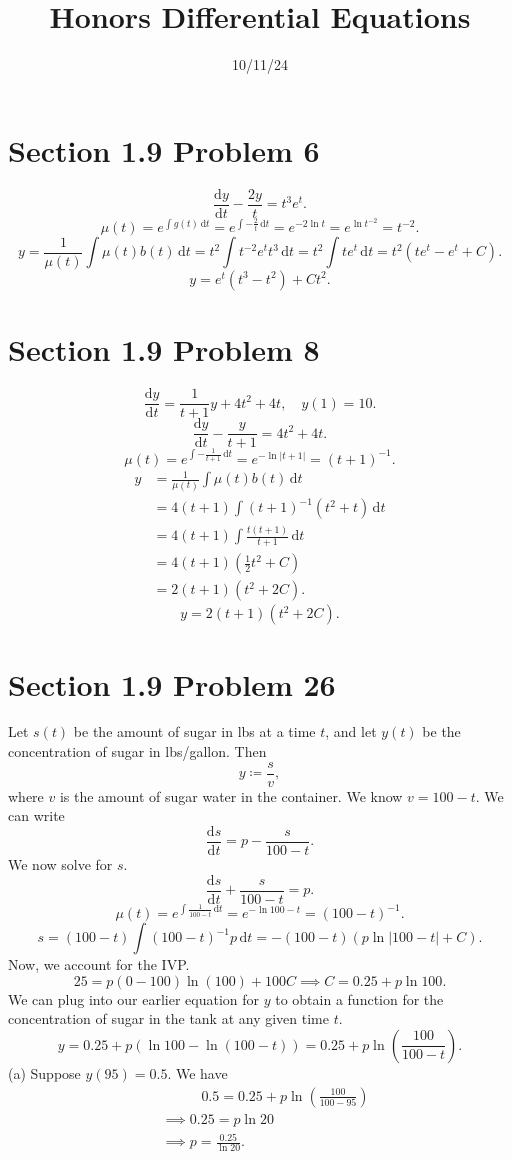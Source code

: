 \documentclass[11pt, letterpaper]{report}
\title{Honors Differential Equations}
\date{10/11/24}
\begin{document}
\makeproblem
\section*{Section 1.9 Problem 6}
\[
	\frac{\mathrm{d}y}{\mathrm{d}t} -\frac{2y}{t}=t^3e^t
.\]
\[
	\mu (t)=e^{\int g(t) \,\mathrm{d} t}=e^{\int -\frac{2}{t} \,\mathrm{d} t}=e^{-2\ln t}=e^{\ln t^{-2}}=t^{-2}
.\]
\[
	y=\frac{1}{\mu (t)}\int \mu (t)b(t) \,\mathrm{d} t=t^{2}\int t^{-2}e^tt^3 \,\mathrm{d} t=t^{2}\int te^t \,\mathrm{d} t=t^2\left( te^t-e^t+C \right) 
.\]
\[
y	=e^t\left( t^3-t^2 \right) +Ct^2
.\]
\section*{Section 1.9 Problem 8}
\[
	\frac{\mathrm{d}y}{\mathrm{d}t} =\frac{1}{t+1}y+4t^2+4t,\quad y(1)=10
.\]
\[
	\frac{\mathrm{d}y}{\mathrm{d}t} -\frac{y}{t+1}=4t^2+4t
.\]
\[
	\mu (t)=e^{\int -\frac{1}{t+1} \,\mathrm{d} t}=e^{-\ln \left| t+1 \right| }=\left( t+1 \right) ^{-1}
.\]
\begin{align*}
	y&=\frac{1}{\mu (t)}\int \mu (t)b(t) \,\mathrm{d} t\\
	 &=4(t+1)\int \left( t+1 \right) ^{-1}\left( t^2+t \right)  \,\mathrm{d} t\\
	 &=4(t+1)\int \frac{t(t+1)}{t+1} \,\mathrm{d} t\\
	 &=4(t+1)\left( \frac{1}{2}t^2+C \right) \\
	 &=2(t+1)\left( t^2+2C \right) 
.\end{align*}
\[
	y=2(t+1)\left( t^2+2C \right) 
.\]
\section*{Section 1.9 Problem 26}
Let $s(t)$ be the amount of sugar in lbs at a time $t$, and let $y(t)$ be the concentration of sugar in lbs/gallon. Then
\[
	y\coloneqq \frac{s}{v}
,\]
where $v$ is the amount of sugar water in the container. We know $v=100-t$. We can write
\[
	\frac{\mathrm{d}s}{\mathrm{d}t} =p- \frac{s}{100-t}
.\]
We now solve for $s$.
\[
	\frac{\mathrm{d}s}{\mathrm{d}t} +\frac{s}{100-t}=p
.\]
\[
	\mu (t)=e^{\int \frac{1}{100-t} \,\mathrm{d} t}=e^{-\ln 100-t}=\left( 100-t \right) ^{-1}
.\]
\[
	s=(100-t)\int (100-t)^{-1}p \,\mathrm{d} t=-(100-t)(p\ln \left| 100-t \right| +C)
.\]
Now, we account for the IVP.
\[
	25=p(0-100)\ln (100)+100C\implies C=0.25+p\ln 100
.\]
We can plug into our earlier equation for $y$ to obtain a function for the concentration of sugar in the tank at any given time $t$.
\[
	y=0.25+p(\ln 100-\ln (100-t))=0.25+p\ln \left( \frac{100}{100-t} \right) 
.\]
(a) Suppose $y(95)=0.5$. We have
\begin{align*}
	&\qquad\;\;\;0.5=0.25+p\ln \left( \frac{100}{100-95} \right) \\
	&\implies 0.25=p\ln 20\\
	&\implies p=\frac{0.25}{\ln 20}
.\end{align*}
\end{document}
